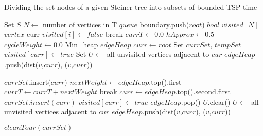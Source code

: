 \begin{algorithm}
\caption{Dividing the set nodes of a given Steiner tree into subsets of bounded TSP time}\label{euclid}
\begin{algorithmic}
\State Set  $S$
\State $N \gets$ number of vertices in T
\State $queue$ boundary.push($root$) 
\State $bool$ $visited[N]$
\State $vertex$ curr 
	\State $visited[i] \gets false$ 
\EndFor
{}
		\State break
	\EndIf
	\State $currT \gets 0.0$ 
	\State $hApprox \gets 0.5$ 
	\State $cycleWeight \gets 0.0$ 
	\State Min\_heap $edgeHeap$  
	\State $curr \gets root$ 
	\State Set $currSet$, $tempSet$ 
	\State $visited[curr] \gets true$ 
	\State Set $U \gets$ all unvisited vertices adjacent to $cur$ 
		\State $edgeHeap$.push(dist($v$,$curr$), ($v$,$curr$)) 
	\EndFor

	\State $currSet$.insert($curr$) 
		\State $nextWeight \gets edgeHeap$.top().first 
		\State $currT \gets currT + nextWeight$ 
			break 
		\EndIf
		\State $curr \gets edgeHeap$.top().second.first 
		\State $currSet.insert(curr)$ 
		\State $visited[curr] \gets true$ 
		\State $edgeHeap$.pop() 
		\State $U$.clear() 
		\State $U \gets$ all unvisited vertices adjacent to $cur$ 
			\State $edgeHeap$.push(dist($v$,$curr$), ($v$,$curr$)) 
		\EndFor
	\EndWhile

	\State $cleanTour(currSet)$
\end{algorithmic}
\end{algorithm}

